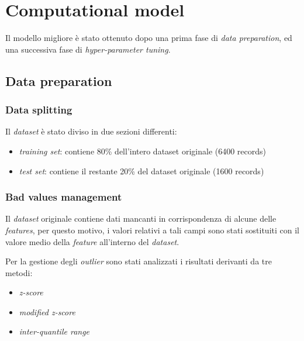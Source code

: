 \section{Computational model}

        Il modello migliore è stato ottenuto dopo una prima fase di \textit{data preparation}, ed una successiva fase di \textit{hyper-parameter tuning}.

        \subsection{Data preparation}
        
                \subsubsection{Data splitting}
                
                        Il \textit{dataset} è stato diviso in due sezioni differenti:
                        \begin{itemize}
                                \item \textit{training set}: contiene 80\% dell'intero dataset originale (6400 records)
                                \item \textit{test set}: contiene il restante 20\% del dataset originale (1600 records)
                        \end{itemize}
                
                \subsubsection{Bad values management}
                
                        Il \textit{dataset} originale contiene dati mancanti in corrispondenza di alcune delle \textit{features}, per questo motivo, i valori relativi a tali campi sono stati sostituiti con il valore medio della \textit{feature} all'interno del \textit{dataset}.
                        \bigbreak
                        
                        Per la gestione degli \textit{outlier} sono stati analizzati i risultati derivanti da tre metodi:
                        \begin{itemize}
                            \item \textit{z-score}
                            \item \textit{modified z-score}
                            \item \textit{inter-quantile range}
                        \end{itemize}
                        
